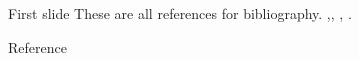 \documentclass[xcolor={dvipsnames,table},12pt]{beamer}
\begin{document}
\begin{frame}{First slide}
These are all references for bibliography.
\cite{Balle2002} ,\cite{Holden2005}, \cite{Delery2000}, \cite{Bountin2013}.
\end{frame}

\begin{frame}{Reference}
 

\end{frame}
\end{document}
